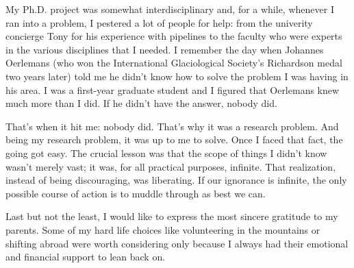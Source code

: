 My Ph.D. project was somewhat interdisciplinary and, for a while, whenever I ran into a problem, I pestered a
lot of people for help: from the univerity concierge Tony for his experience with pipelines to the faculty who
were experts in the various disciplines that I needed. I remember the day when Johannes Oerlemans (who won the
International Glaciological Society's Richardson medal two years later) told me he didn't know how to solve the
problem I was having in his area. I was a first-year graduate student and I figured that Oerlemans knew much
more than I did. If he didn't have the answer, nobody did.

That's when it hit me: nobody did. That's why it was a research problem. And being my research problem, it was
up to me to solve. Once I faced that fact, the going got easy. The crucial lesson was that the scope of things I
didn't know wasn't merely vast; it was, for all practical purposes, infinite. That realization, instead of being
discouraging, was liberating. If our ignorance is infinite, the only possible course of action is to muddle
through as best we can.

Last but not the least, I would like to express the most sincere gratitude to my parents. Some of my hard life
choices like volunteering in the mountains or shifting abroad were worth considering only because I always had
their emotional and financial support to lean back on.











